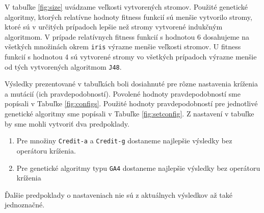V tabuľke \ref{fig:size} uvádzame veľkosti vytvorených stromov. Použité genetické algoritmy, ktorých relatívne hodnoty fitness funkcií sú menšie vytvorilo stromy, ktoré sú v určitých prípadoch lepšie než stromy vytvorené indukčným algoritmom. V prípade relatívnych fitness funkcií s hodnotou 6 dosahujeme na všetkých množinách okrem \verb|iris| výrazne menšie veľkosti stromov. U fitness funkcií s hodnotou 4 sú vytvorené stromy vo všetkých prípadoch výrazne menšie od tých vytvorených algoritmom \verb|J48|. 

Výsledky prezentované v tabuľkách boli dosiahnuté pre rôzne nastavenia kríženia a mutácií (ich pravdepodobností). Povolené hodnoty pravdepodobností sme popísali v Tabuľke \ref{fig:configs}. Použité hodnoty pravdepodobností pre jednotlivé genetické algoritmy sme popísali v Tabuľke \ref{fig:setconfig}. Z nastavení v tabuľke by sme mohli vytvoriť dva predpoklady.
\begin{enumerate}
\item Pre množiny \verb|Credit-a| a \verb|Credit-g| dostaneme najlepšie výsledky bez operátoru kríženia.
\item Pre genetické algoritmy typu \verb|GA4| dostaneme najlepšie výsledky bez operátoru kríženia
\end{enumerate}
Ďalšie predpoklady o nastaveniach nie sú z aktuálnych výsledkov až také jednoznačné.

